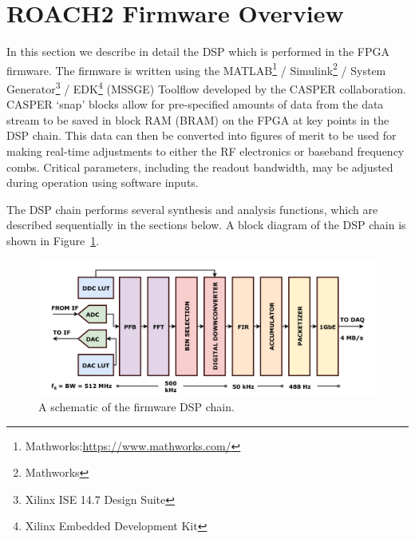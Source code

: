 \section{ROACH2 Firmware Overview}\label{firmware}

In this section we describe in detail the DSP which is performed in the FPGA firmware. The firmware is written using the MATLAB\footnote{Mathworks:\url{https://www.mathworks.com/}} / Simulink\footnote{Mathworks} / System Generator\footnote{Xilinx ISE 14.7 Design Suite} / EDK\footnote{Xilinx Embedded Development Kit} (MSSGE) Toolflow developed by the CASPER collaboration. CASPER `snap' blocks allow for pre-specified amounts of data from the data stream to be saved in block RAM (BRAM) on the FPGA at key points in the DSP chain. This data can then be converted into figures of merit to be used for making real-time adjustments to either the RF electronics or baseband frequency combs. Critical parameters, including the readout bandwidth, may be adjusted during operation using software inputs.

The DSP chain performs several synthesis and analysis functions, which are described sequentially in the sections below. A block diagram of the DSP chain is shown in Figure~\ref{fig:DSP schematic}.

\begin{figure}
\centering
\includegraphics[width=\textwidth]{figures/readout/schematics/readoutDSPdiagram}
\caption{A schematic of the firmware DSP chain.}
\label{fig:DSP schematic}
\end{figure}

